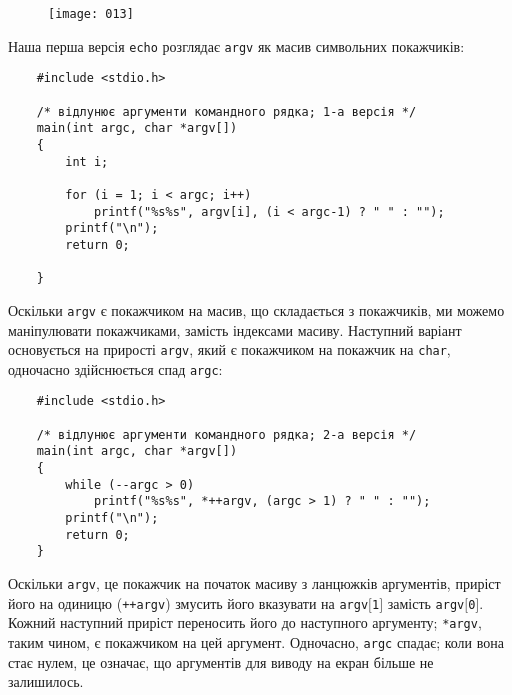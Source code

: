 \documentclass[a4paper,12pt]{book}
\begin{document}

  \begin{figure}[!htb]
  \centering
  \texttt{[image: 013]}
  \end{figure}

  Наша перша версія \texttt{echo} розглядає \texttt{argv} як масив символьних покажчиків:
  \begin{verbatim}
    #include <stdio.h>

    /* відлунює аргументи командного рядка; 1-а версія */
    main(int argc, char *argv[])
    {
        int i;

        for (i = 1; i < argc; i++)
            printf("%s%s", argv[i], (i < argc-1) ? " " : "");
        printf("\n");
        return 0;

    }
  \end{verbatim}

  Оскільки \texttt{argv} є покажчиком на масив, що складається з покажчиків, ми можемо
  маніпулювати покажчиками, замість індексами масиву. Наступний варіант основується на
  прирості \texttt{argv}, який є покажчиком на покажчик на \texttt{char}, одночасно
  здійснюється спад \texttt{argc}:
  \begin{verbatim}
    #include <stdio.h>

    /* відлунює аргументи командного рядка; 2-а версія */
    main(int argc, char *argv[])
    {
        while (--argc > 0)
            printf("%s%s", *++argv, (argc > 1) ? " " : "");
        printf("\n");
        return 0;
    }
  \end{verbatim}

  Оскільки \texttt{argv}, це покажчик на початок масиву з ланцюжків аргументів, приріст
  його на одиницю (\texttt{++argv}) змусить його вказувати на
  \texttt{argv\mbox{$[$}1\mbox{$]$}} замість \texttt{argv\mbox{$[$}0\mbox{$]$}}. Кожний
  наступний приріст переносить його до наступного аргументу; \texttt{*argv}, таким чином,
  є покажчиком на цей аргумент. Одночасно, \texttt{argc} спадає; коли вона стає нулем, це
  означає, що аргументів для виводу на екран більше не залишилось.
\end{document}
